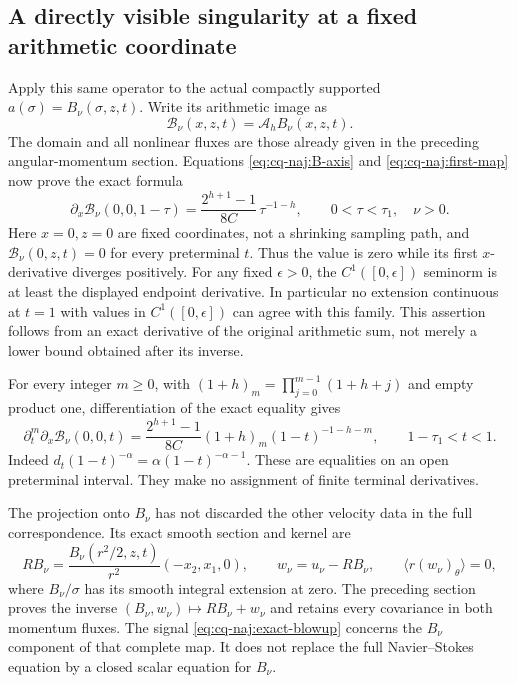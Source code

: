 \subsection{A directly visible singularity at a fixed arithmetic coordinate}

Apply this same operator to the actual compactly supported
\(a(\sigma)=B_\nu(\sigma,z,t)\). Write its arithmetic image as
\[
 \mathcal B_\nu(x,z,t)=\mathcal A_hB_\nu(x,z,t).
\]
The domain and all nonlinear fluxes are those already given in the
preceding angular-momentum section. Equations \eqref{eq:cq-naj:B-axis} and
\eqref{eq:cq-naj:first-map} now prove the exact formula
\begin{equation}\label{eq:cq-naj:exact-blowup}
 \boxed{\displaystyle
 \partial_x\mathcal B_\nu(0,0,1-\tau)
    =\frac{2^{h+1}-1}{8C}\,\tau^{-1-h},
       \qquad 0<\tau<\tau_1,\quad \nu>0 .}
\end{equation}
Here \(x=0,z=0\) are fixed coordinates, not a shrinking sampling path,
and \(\mathcal B_\nu(0,z,t)=0\) for every preterminal \(t\).
Thus the value is zero while its first \(x\)-derivative diverges
positively. For any fixed \(\epsilon>0\), the \(C^1([0,\epsilon])\)
seminorm is at least the displayed endpoint derivative. In particular
no extension continuous at \(t=1\) with values in
\(C^1([0,\epsilon])\) can agree with this family.
This assertion follows from an exact derivative of the original
arithmetic sum, not merely a lower bound obtained after its inverse.

For every integer \(m\ge0\), with \((1+h)_m=\prod_{j=0}^{m-1}(1+h+j)\) and empty product one, differentiation of the exact equality gives
\[
 \partial_t^m\partial_x\mathcal B_\nu(0,0,t)
  =\frac{2^{h+1}-1}{8C}(1+h)_m(1-t)^{-1-h-m},
 \qquad 1-\tau_1<t<1 .
\]
Indeed \(d_t(1-t)^{-\alpha}=\alpha(1-t)^{-\alpha-1}\).
These are equalities on an open preterminal interval. They make no
assignment of finite terminal derivatives.

The projection onto \(B_\nu\) has not discarded the other velocity
data in the full correspondence. Its exact smooth section and kernel
are
\[
 R B_\nu=\frac{B_\nu(r^2/2,z,t)}{r^2}(-x_2,x_1,0),\qquad
 w_\nu=u_\nu-RB_\nu,\qquad \langle r(w_\nu)_\theta\rangle=0,
\]
where \(B_\nu/\sigma\) has its smooth integral extension at zero.
The preceding section proves the inverse
\((B_\nu,w_\nu)\mapsto RB_\nu+w_\nu\) and retains every covariance
in both momentum fluxes. The signal \eqref{eq:cq-naj:exact-blowup} concerns
the \(B_\nu\) component of that complete map. It does not replace the
full Navier--Stokes equation by a closed scalar equation for \(B_\nu\).


